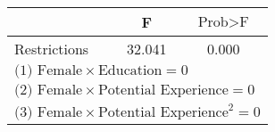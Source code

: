 {
\def\sym#1{\ifmmode^{#1}\else\(^{#1}\)\fi}
\begin{tabular}{l*{1}{cc}}
\hline\hline
          &        F&$\text{Prob}>\text{F}$\\
\hline
Restrictions&   32.041&    0.000\\
\hline\hline
\multicolumn{3}{l}{\footnotesize $\text{(1) Female}\times\text{Education} = 0$}\\
\multicolumn{3}{l}{\footnotesize $\text{(2) Female}\times\text{Potential Experience} = 0$}\\
\multicolumn{3}{l}{\footnotesize $\text{(3) Female}\times\text{Potential Experience}^2 = 0$}\\
\end{tabular}
}
